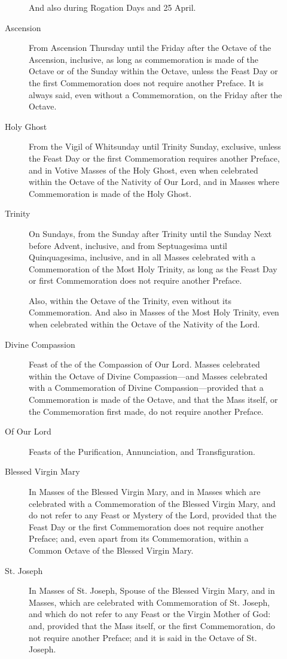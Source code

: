 \begin{description}
\begin{description}
            And also during Rogation Days and 25 April.
            \item[Ascension] From Ascension Thursday until the Friday after the Octave of the Ascension, inclusive, as long as commemoration is made of the Octave or of the Sunday within the Octave, unless the Feast Day or the first Commemoration does not require another Preface. It is always said, even without a Commemoration, on the Friday after the Octave.
            \item[Holy Ghost] From the Vigil of Whitsunday until Trinity Sunday, exclusive, unless the Feast Day or the first Commemoration requires another Preface, and in Votive Masses of the Holy Ghost, even when celebrated within the Octave of the Nativity of Our Lord, and in Masses where Commemoration is made of the Holy Ghost.
            \item[Trinity] On Sundays, from the  Sunday after Trinity until the Sunday Next before Advent, inclusive, and from Septuagesima until Quinquagesima, inclusive, and in all Masses celebrated with a Commemoration of the Most Holy Trinity, as long as the Feast Day or first Commemoration does not require another Preface.\par
            Also, within the Octave of the Trinity, even without its Commemoration. And also in Masses of the Most Holy Trinity, even when celebrated within the Octave of the Nativity of the Lord.
            \item[Divine Compassion] Feast of the of the Compassion of Our Lord. Masses celebrated within the Octave of Divine Compassion---and Masses celebrated with a Commemoration of Divine Compassion---provided that a Commemoration is made of the Octave, and that the Mass itself, or the Commemoration first made, do not require another Preface.
            \item[Of Our Lord] Feasts of the Purification, Annunciation, and Transfiguration.
            \item[Blessed Virgin Mary] In Masses of the Blessed Virgin Mary, and in Masses which are celebrated with a Commemoration of the Blessed Virgin Mary, and do not refer to any Feast or Mystery of the Lord, provided that the Feast Day or the first Commemoration does not require another Preface; and, even apart from its Commemoration, within a Common Octave of the Blessed Virgin Mary.
            \item[St. Joseph] In Masses of St. Joseph, Spouse of the Blessed Virgin Mary, and in Masses, which are celebrated with Commemoration of St. Joseph, and which do not refer to any Feast or the Virgin Mother of God: and, provided that the Mass itself, or the first Commemoration, do not require another Preface; and it is said in the Octave of St. Joseph.

\end{description}
\end{description}
